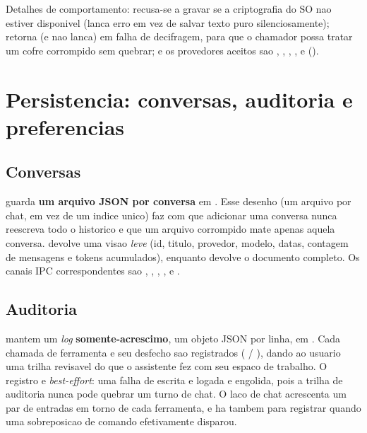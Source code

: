 Detalhes de comportamento:  recusa-se a gravar se a criptografia do
SO nao estiver disponivel (lanca erro em vez de salvar texto puro silenciosamente);
 retorna  (e nao lanca) em falha de decifragem, para que o
chamador possa tratar um cofre corrompido sem quebrar; e os provedores aceitos
sao , , , , 
e  ().

\section{Persistencia: conversas, auditoria e preferencias}

\subsection{Conversas}

 guarda \textbf{um arquivo JSON por conversa} em
. Esse desenho (um arquivo por
chat, em vez de um indice unico) faz com que adicionar uma conversa nunca
reescreva todo o historico e que um arquivo corrompido mate apenas aquela
conversa.  devolve uma visao \emph{leve}
(id, titulo, provedor, modelo, datas, contagem de mensagens e tokens
acumulados), enquanto  devolve o documento completo. Os canais IPC
correspondentes sao , ,
, ,  e
.

\subsection{Auditoria}

 mantem um \emph{log} \textbf{somente-acrescimo}, um objeto
JSON por linha, em . Cada chamada de
ferramenta e seu desfecho sao registrados ( /
), dando ao usuario uma trilha revisavel do que o assistente
fez com seu espaco de trabalho. O registro e \emph{best-effort}: uma falha de
escrita e logada e engolida, pois a trilha de auditoria nunca pode quebrar um
turno de chat. O laco de chat acrescenta um par de entradas em torno de cada
ferramenta, e ha tambem  para registrar quando uma
sobreposicao de comando efetivamente disparou.

